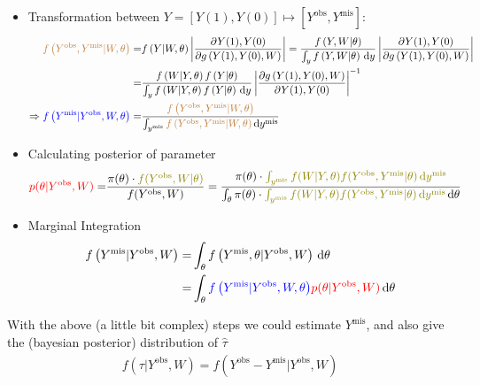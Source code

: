 \begin{itemize}[topsep=2pt,itemsep=0pt]
    \item Transformation between $ Y=[Y(1),Y(0)]\mapsto [Y^\mathrm{obs},Y^\mathrm{mis}  ] $:
    \begin{align}
        {\color{brown}f\left(Y^\mathrm{obs},Y^\mathrm{mis}|W,\theta  \right)}=&f\left(Y|W,\theta \right) \left|\dfrac{\partial^{}Y(1),Y(0) }{\partial g\left(Y(1),Y(0),W\right)}\right|= \dfrac{f\left(Y,W|\theta \right)}{\int _y f\left(Y,W|\theta \right) \,\mathrm{d}y}  \left|\dfrac{\partial^{} Y(1),Y(0) }{\partial g\left(Y(1),Y(0),W\right)}\right|\\
        =& \dfrac{f\left(W|Y,\theta \right)f\left(Y|\theta \right)}{\int _y f\left(W|Y,\theta \right) f\left(Y|\theta \right) \,\mathrm{d}y}  \left|\dfrac{\partial g\left(Y(1),Y(0),W\right)}{\partial^{} Y(1),Y(0) }\right|^{-1}\\
        \Rightarrow {\color{blue}f\left(Y^\mathrm{mis}|Y^\mathrm{obs},W,\theta   \right)}=&\dfrac{{\color{brown}f\left(Y^\mathrm{obs},Y^\mathrm{mis}|W,\theta  \right)}}{\int _{y^\mathrm{mis} }{\color{brown}f\left(Y^\mathrm{obs},Y^\mathrm{mis}|W,\theta  \right) }\,\mathrm{d}y^\mathrm{mis} } 
    \end{align}
    \item Calculating posterior of parameter
    \begin{align}
         {\color{red}p(\theta |Y^\mathrm{obs},W )}=&\dfrac{\pi(\theta )\cdot {\color{olive}f(Y^\mathrm{obs},W|\theta  )}}{f(Y^\mathrm{obs},W )}=\dfrac{\pi(\theta )\cdot\color{olive} \int_{y^\mathrm{mis} } f(W|Y,\theta )f(Y^\mathrm{obs},Y^\mathrm{mis}|\theta   )\,\mathrm{d}y^\mathrm{mis}}{\int_{\theta }\pi(\theta )\cdot{\color{olive} \int_{y^\mathrm{mis} } f(W|Y,\theta )f(Y^\mathrm{obs},Y^\mathrm{mis}|\theta   )\,\mathrm{d}y^\mathrm{mis}} \,\mathrm{d}\theta  }
    \end{align}
    \item Marginal Integration
    \begin{align}
        f\left(Y^\mathrm{mis}|Y^\mathrm{obs},W  \right) =& \int _{\theta }f\left(Y^\mathrm{mis},\theta |Y^\mathrm{obs} ,W \right) \,\mathrm{d}\theta \\
        =& \int _{\theta  }{\color{blue}f\left(Y^\mathrm{mis}|Y^\mathrm{obs},W,\theta   \right)}{\color{red}p(\theta |Y^\mathrm{obs},W )} \,\mathrm{d}\theta 
    \end{align}    
\end{itemize}

    With the above (a little bit complex) steps we could estimate $ Y^\mathrm{mis}  $, and also give the (bayesian posterior) distribution of $ \hat{\tau} $
    \begin{align}
        f({\tau|Y^\mathrm{obs},W })=f(Y^\mathrm{obs}- Y^\mathrm{mis}|Y^\mathrm{obs},W ) 
    \end{align}
    
